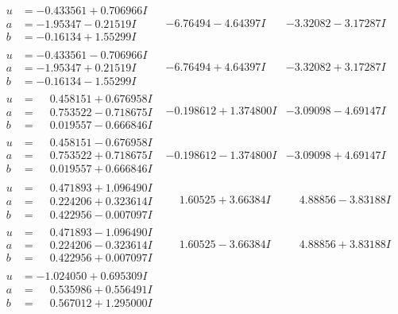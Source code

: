 \documentclass[1p]{elsarticle_modified}
\theoremstyle{definition}
\begin{document}
$$\begin{array}{c|c|c}
\begin{aligned}
u &= -0.433561 + 0.706966 I \\
a &= -1.95347 - 0.21519 I \\
b &= -0.16134 + 1.55299 I\end{aligned}
 & -6.76494 - 4.64397 I & -3.32082 - 3.17287 I \\ \hline\begin{aligned}
u &= -0.433561 - 0.706966 I \\
a &= -1.95347 + 0.21519 I \\
b &= -0.16134 - 1.55299 I\end{aligned}
 & -6.76494 + 4.64397 I & -3.32082 + 3.17287 I \\ \hline\begin{aligned}
u &= \phantom{-}0.458151 + 0.676958 I \\
a &= \phantom{-}0.753522 - 0.718675 I \\
b &= \phantom{-}0.019557 - 0.666846 I\end{aligned}
 & -0.198612 + 1.374800 I & -3.09098 - 4.69147 I \\ \hline\begin{aligned}
u &= \phantom{-}0.458151 - 0.676958 I \\
a &= \phantom{-}0.753522 + 0.718675 I \\
b &= \phantom{-}0.019557 + 0.666846 I\end{aligned}
 & -0.198612 - 1.374800 I & -3.09098 + 4.69147 I \\ \hline\begin{aligned}
u &= \phantom{-}0.471893 + 1.096490 I \\
a &= \phantom{-}0.224206 + 0.323614 I \\
b &= \phantom{-}0.422956 - 0.007097 I\end{aligned}
 & \phantom{-}1.60525 + 3.66384 I & \phantom{-}4.88856 - 3.83188 I \\ \hline\begin{aligned}
u &= \phantom{-}0.471893 - 1.096490 I \\
a &= \phantom{-}0.224206 - 0.323614 I \\
b &= \phantom{-}0.422956 + 0.007097 I\end{aligned}
 & \phantom{-}1.60525 - 3.66384 I & \phantom{-}4.88856 + 3.83188 I \\ \hline\begin{aligned}
u &= -1.024050 + 0.695309 I \\
a &= \phantom{-}0.535986 + 0.556491 I \\
b &= \phantom{-}0.567012 + 1.295000 I\end{aligned}

\end{array}$$
\end{document}
